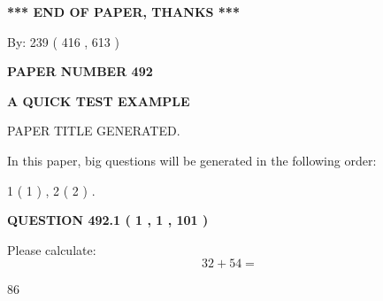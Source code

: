 \documentclass[12pt]{article}
\begin{document}
   
   
   
\vspace{1.0in} 
{\textbf{\large{ *** END OF PAPER, THANKS *** }}} 
   
   
\hspace{1.0in} By: 
 239 ( 416 ,  613 )
   
   
   
   
\newpage 
\setcounter{page}{ 
   492001 } 
   
   
   
   
 {\textbf{ \Large{ PAPER NUMBER  492  }}}
   
   
\vspace{0.2in}
   
   
   
   
   
   
   
   
 \vspace{0.2in}
{\LARGE {\textbf{ A QUICK TEST EXAMPLE}}}
   
   
 PAPER TITLE GENERATED.
   
   
   
\vspace{0.2in}
   
In this paper, big questions will be generated in the following order: 
   
   
   1 ( 1 )
 ,
   2 ( 2 )
 .
  
\vspace{0.2in}
  
{\textbf{\Large{QUESTION
492.1 
 ( 1 , 1 , 101 )
}}}
  
  
 
Please calculate:
\begin{equation}
32 +  %
54 = \nonumber
\end{equation}
 
 
 
\noindent{}
 
 

86
 
 
\noindent{}
 
 

 
 
 
\noindent{}
 
\end{document}
